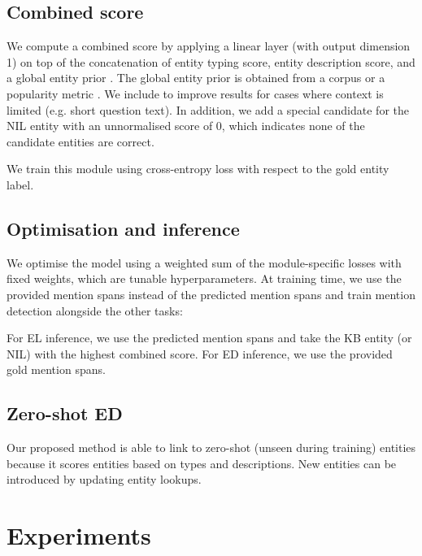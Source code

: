 \documentclass[11pt]{article}
\begin{document}
\subsection{Combined score }\label{combined_score}
We compute a combined score  by applying a linear layer (with output dimension 1)  on top of the concatenation of entity typing score, entity description score, and a global entity prior . The global entity prior is obtained from a corpus \citep{hoffart-etal-2011-robust} or a popularity metric \citep{diefenbach:hal-01905724}. We include  to improve results for cases where context is limited (e.g. short question text). In addition, we add a special candidate for the NIL entity with an unnormalised score of 0, which indicates none of the candidate entities are correct.

We train this module using cross-entropy loss  with respect to the gold entity label.
\subsection{Optimisation and inference}
We optimise the model using a weighted sum of the module-specific losses with fixed weights, which are tunable hyperparameters. At training time, we use the provided mention spans instead of the predicted mention spans and train mention detection alongside the other tasks:


For EL inference, we use the predicted mention spans and take the KB entity (or NIL) with the highest combined score.
For ED inference, we use the provided gold mention spans.

\subsection{Zero-shot ED}
Our proposed method is able to link to zero-shot (unseen during training) entities because it scores entities based on types and descriptions. New entities can be introduced by updating entity lookups. 














\section{Experiments} \label{experiments}
\end{document}
